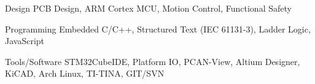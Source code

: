 


\begin{cvskills}

    \cvskill
    {Design} %
    {PCB Design, ARM Cortex MCU, Motion Control, Functional Safety} %

    \cvskill
    {Programming} %
    {Embedded C/C++, Structured Text (IEC 61131-3), Ladder Logic, JavaScript } %



    \cvskill
    {Tools/Software} %
    {STM32CubeIDE, Platform IO, PCAN-View, Altium Designer, KiCAD, Arch Linux, TI-TINA, GIT/SVN} %


\end{cvskills}